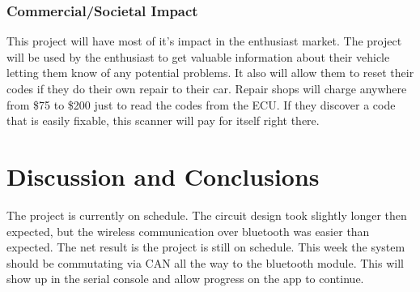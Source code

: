 \documentclass[12pt,letterpaper]{article}
\begin{document}
\subsubsection{Commercial/Societal Impact}
This project will have most of it's impact in the enthusiast market. The project will be used by the enthusiast to get valuable information about their vehicle letting them know of any potential problems. It also will allow them to reset their codes if they do their own repair to their car. Repair shops will charge anywhere from \$75 to \$200 just to read the codes from the ECU. If they discover a code that is easily fixable, this scanner will pay for itself right there.

\newpage

\section{Discussion and Conclusions}
The project is currently on schedule. The circuit design took slightly longer then expected, but the wireless communication over bluetooth was easier than expected. The net result is the project is still on schedule. This week the system should be commutating via CAN all the way to the bluetooth module. This will show up in the serial console and allow progress on the app to continue. 
\end{document}
